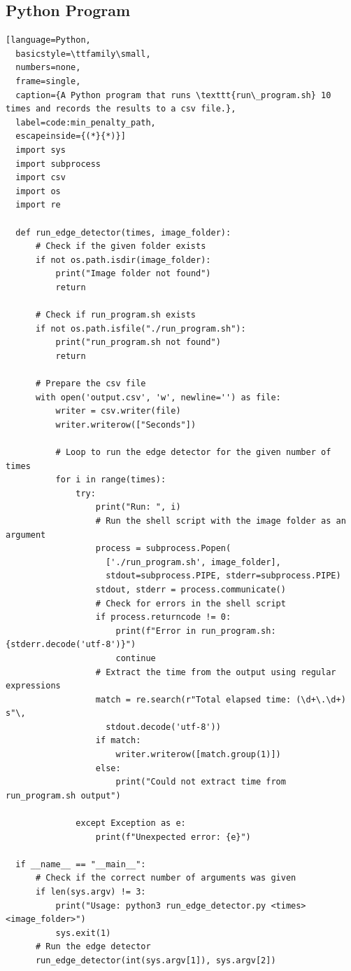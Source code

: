 \documentclass{article}
\begin{document}
\subsection*{Python Program}
\begin{lstlisting}[language=Python, 
  basicstyle=\ttfamily\small, 
  numbers=none, 
  frame=single, 
  caption={A Python program that runs \texttt{run\_program.sh} 10 times and records the results to a csv file.},
  label=code:min_penalty_path,
  escapeinside={(*}{*)}]
  import sys
  import subprocess
  import csv
  import os
  import re
  
  def run_edge_detector(times, image_folder):
      # Check if the given folder exists
      if not os.path.isdir(image_folder):
          print("Image folder not found")
          return
  
      # Check if run_program.sh exists
      if not os.path.isfile("./run_program.sh"):
          print("run_program.sh not found")
          return
  
      # Prepare the csv file
      with open('output.csv', 'w', newline='') as file:
          writer = csv.writer(file)
          writer.writerow(["Seconds"])
  
          # Loop to run the edge detector for the given number of times
          for i in range(times):
              try:
                  print("Run: ", i)
                  # Run the shell script with the image folder as an argument
                  process = subprocess.Popen(
                    ['./run_program.sh', image_folder],
                    stdout=subprocess.PIPE, stderr=subprocess.PIPE)
                  stdout, stderr = process.communicate()
                  # Check for errors in the shell script
                  if process.returncode != 0:
                      print(f"Error in run_program.sh: {stderr.decode('utf-8')}")
                      continue
                  # Extract the time from the output using regular expressions
                  match = re.search(r"Total elapsed time: (\d+\.\d+) s"\,
                    stdout.decode('utf-8'))
                  if match:
                      writer.writerow([match.group(1)])
                  else:
                      print("Could not extract time from run_program.sh output")
  
              except Exception as e:
                  print(f"Unexpected error: {e}")
  
  if __name__ == "__main__":
      # Check if the correct number of arguments was given
      if len(sys.argv) != 3:
          print("Usage: python3 run_edge_detector.py <times> <image_folder>")
          sys.exit(1)
      # Run the edge detector
      run_edge_detector(int(sys.argv[1]), sys.argv[2])
  
\end{lstlisting} 
\end{document}
